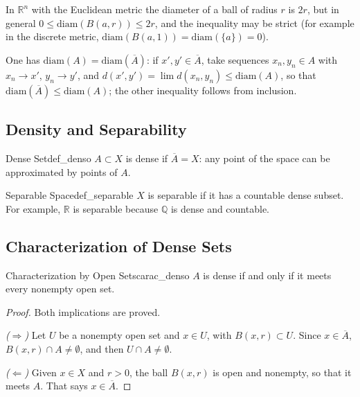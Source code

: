 \documentclass[11pt, a4paper]{article}
\begin{document}
\obs In $\mathbb{R}^n$ with the Euclidean metric the diameter of a ball of radius $r$ is $2r$,
but in general $0 \le \mathrm{diam}(B(a, r)) \le 2r$, and the inequality may be strict (for
example in the discrete metric, $\mathrm{diam}(B(a, 1)) = \mathrm{diam}(\{a\}) = 0$).

\obs One has $\mathrm{diam}(A) = \mathrm{diam}(\overline{A})$: if $x', y' \in \overline{A}$, take
sequences $x_n, y_n \in A$ with $x_n \to x'$, $y_n \to y'$, and
$d(x', y') = \lim d(x_n, y_n) \le \mathrm{diam}(A)$, so that
$\mathrm{diam}(\overline{A}) \le \mathrm{diam}(A)$; the other inequality follows from inclusion.

\subsection{Density and Separability}

\begin{definicion}{Dense Set}{def_denso}
$A \subset X$ is dense if $\overline{A} = X$: any point of the space can be approximated by
points of $A$.
\end{definicion}

\begin{definicion}{Separable Space}{def_separable}
$X$ is separable if it has a countable dense subset. For example, $\mathbb{R}$ is separable
because $\mathbb{Q}$ is dense and countable.
\end{definicion}

\subsection{Characterization of Dense Sets}

\begin{proposicion}{Characterization by Open Sets}{carac_denso}
$A$ is dense if and only if it meets every nonempty open set.
\end{proposicion}

\begin{proof}
Both implications are proved.

\textit{($\Rightarrow$)} Let $U$ be a nonempty open set and $x \in U$, with $B(x, r) \subset U$. Since
$x \in \overline{A}$, $B(x, r) \cap A \ne \emptyset$, and then $U \cap A \ne \emptyset$.

\textit{($\Leftarrow$)} Given $x \in X$ and $r > 0$, the ball $B(x, r)$ is open and nonempty, so that it meets
$A$. That says $x \in \overline{A}$.
\end{proof}
\end{document}
